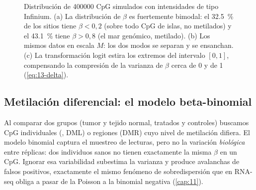 \begin{figure}[t]
\centering
{}
\caption[Distribución de valores $\beta$ y $M$]{Distribución de \num{400000} CpG simulados con intensidades de tipo Infinium. (a) La distribución de $\beta$ es fuertemente bimodal: el \SI{32,5}{\percent} de los sitios tiene $\beta<0{,}2$ (sobre todo CpG de islas, no metilados) y el \SI{43,1}{\percent} tiene $\beta>0{,}8$ (el mar genómico, metilado). (b) Los mismos datos en escala $M$: los dos modos se separan y se ensanchan. (c) La transformación logit estira los extremos del intervalo $[0,1]$, compensando la compresión de la varianza de $\beta$ cerca de 0 y de 1 (\cref{eq:13-delta}).}
\label{fig:13-beta}
\end{figure}

\subsection{Metilación diferencial: el modelo beta-binomial}

Al comparar dos grupos (tumor y tejido normal, tratados y controles) buscamos CpG individuales (, DML) o regiones (DMR) cuyo nivel de metilación difiera. El modelo binomial captura el muestreo de lecturas, pero no la variación \emph{biológica} entre réplicas: dos individuos sanos no tienen exactamente la misma $\beta$ en un CpG. Ignorar esa variabilidad subestima la varianza y produce avalanchas de falsos positivos, exactamente el mismo fenómeno de sobredispersión que en RNA-seq obliga a pasar de la Poisson a la binomial negativa (\cref{cap:11}).

